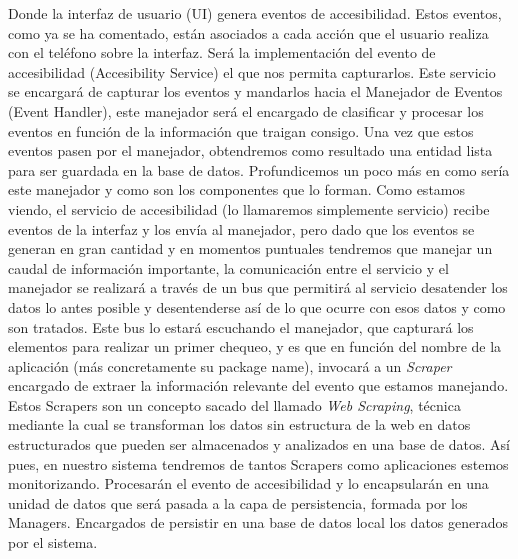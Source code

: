 \documentclass[12pt,a4paper,oneside]{book} %
\begin{document}
Donde la interfaz de usuario (UI) genera eventos de accesibilidad. Estos eventos, como ya se ha comentado, están asociados a cada acción que el usuario realiza con el teléfono sobre la interfaz. Será la implementación del evento de accesibilidad (Accesibility Service) el que nos permita capturarlos. 
\newline
\newline
Este servicio se encargará de capturar los eventos y mandarlos hacia el Manejador de Eventos (Event Handler), este manejador será el encargado de clasificar y procesar los eventos en función de la información que traigan consigo. 
\newline
\newline
Una vez que estos eventos pasen por el manejador, obtendremos como resultado una entidad lista para ser guardada en la base de datos. 
\newline
\newline
Profundicemos un poco más en como sería este manejador y como son los componentes que lo forman. 
\newline
\newline
Como estamos viendo, el servicio de accesibilidad (lo llamaremos simplemente servicio) recibe eventos de la interfaz y los envía al manejador, pero dado que los eventos se generan en gran cantidad y en momentos puntuales tendremos que manejar un caudal de información importante, la comunicación entre el servicio y el manejador se realizará a través de un bus que permitirá al servicio desatender los datos lo antes posible y desentenderse así de lo que ocurre con esos datos y como son tratados.
\newline
\newline
Este bus lo estará escuchando el manejador, que capturará los elementos para realizar un primer chequeo, y es que en función del nombre de la aplicación (más concretamente su package name), invocará a un \textit{Scraper} encargado de extraer la información relevante del evento que estamos manejando. 
\newline
\newline
Estos Scrapers son un concepto sacado del llamado \textit{Web Scraping}, técnica mediante la cual se transforman los datos sin estructura de la web en datos estructurados que pueden ser almacenados y analizados en una base de datos. 
\newline
\newline
Así pues, en nuestro sistema tendremos de tantos Scrapers como aplicaciones estemos monitorizando. Procesarán el evento de accesibilidad y lo encapsularán en una unidad de datos que será pasada a la capa de persistencia, formada por los Managers. Encargados de persistir en una base de datos local los datos generados por el sistema. 
\end{document}
